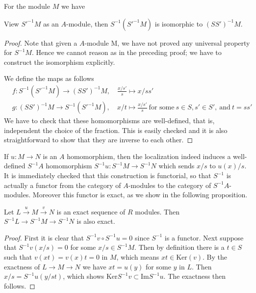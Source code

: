 \noindent
For the module $M$ we have

\begin{proposition}
View $S'^{-1}M$ as an $A$-module, then $S^{-1}(S'^{-1}M)$ is
isomorphic to $(SS')^{-1}M$.
\end{proposition}

\begin{proof}
Note that given a $A$-module M, we have not proved any
universal property for $S^{-1}M$. Hence we cannot reason
as in the preceding proof; we have to construct the isomorphism explicitly.

\medskip\noindent
We define the maps as follows
\begin{align*}
&f : S^{-1}(S'^{-1}M) \longrightarrow (SS')^{-1}M, \quad \frac{x/s'}{s}\mapsto
x/ss'\\
&g : (SS')^{-1}M \longrightarrow S^{-1}(S'^{-1}M), \quad x/t\mapsto
\frac{x/s'}{s}\ \text{for some}\ s\in S, s'\in S', \ \text{and}\ 
t = ss'
\end{align*}
We have to check that these homomorphisms are well-defined, that is,
independent the choice of the fraction. This is easily checked and it is also
straightforward to show that they are inverse to each other.
\end{proof}

\noindent
If $u : M\rightarrow N$ is an $A$ homomorphism, then the localization indeed
induces a well-defined $S^{-1}A$ homomorphism $S^{-1}u : S^{-1}M\rightarrow
S^{-1}N$ which sends $x/s$ to $u(x)/s$. It is immediately checked that
this construction is functorial, so that $S^{-1}$
is actually a functor from the category of $A$-modules to the
category of $S^{-1}A$-modules. Moreover this functor is exact,
as we show in the following proposition.

\begin{proposition}
\label{proposition-localization-exact}
Let $L\xrightarrow{u} M\xrightarrow{v} N$ is an exact sequence
of $R$ modules. Then
$S^{-1}L\rightarrow S^{-1}M\rightarrow S^{-1}N$ is also exact.
\end{proposition}

\begin{proof}
First it is clear that $S^{-1}v\circ S^{-1}u = 0$ since $S^{-1}$ is a
functor. Next suppose that $S^{-1}v(x/s) = 0$ for some $x/s\in
S^{-1}M$. Then by definition there is a $t\in S$ such that
$v(xt) = v(x)t = 0$ in $M$, which means $xt\in\text{Ker}(v)$.
By the exactness of $L\rightarrow M\rightarrow
N$ we have $xt = u(y)$ for some $y$ in $L$. Then $x/s = S^{-1}u(y/st)$,
which shows $\text{Ker} S^{-1}v\subset\text{Im} S^{-1}u$. The exactness then
follows.
\end{proof}


